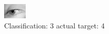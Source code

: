 \begin{figure}[h!]
\begin{center}
\includegraphics[width=0.60\columnwidth]{figures/ID2934_class_3_target_4.png}
\end{center}
\caption{ Classification: 3 actual target: 4}
\label{fig:ID2934_class_3_target_4}
\end{figure}
